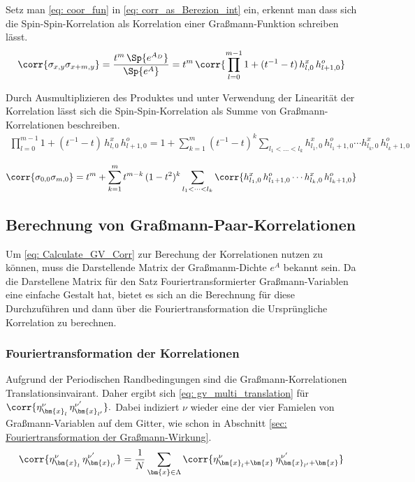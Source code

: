 \noindent Setz man \eqref{eq: coor_fun} in \eqref{eq: corr_as_Berezion_int} ein, erkennt man dass sich die Spin-Spin-Korrelation als Korrelation einer Graßmann-Funktion schreiben lässt.  
\begin{equation} \nonumber
\corr{\sigma_{x,y} \sigma_{x+m,y}} 
    =\frac{t^m \, \Sp{e^{A_D}}}{\Sp{e^A}} 
    =  t^m \, \corr{\prod_{l = 0}^{m-1} 1 + (t^{-1} - t)\, h_{l,0}^x\, h_{l+1,0}^o} 
\end{equation}

\noindent Durch Ausmultiplizieren des Produktes und unter Verwendung der Linearität der Korrelation lässt sich die Spin-Spin-Korrelation als Summe von Graßmann-Korrelationen beschreiben. 
\begin{align}
\prod_{l = 0}^{m-1} 1 + (t^{-1} - t)\, h_{l,0}^x\, h_{l+1,0}^o
= 1 + \sum_{k = 1}^{m} (t^{-1}-t)^k \sum_{l_1 < \dots < l_k} h_{l_1,0}^x\, h_{l_1+1,0}^o \cdots h_{l_k,0}^x\, h_{l_k+1,0}^o
\end{align}

\begin{grayframe}[frametitle = {Spin-Spin-Korrelation als Summe von Graßmann-Korrelationen}]
\begin{equation} \label{eq: Spin-Spin-Corr as Sum of GV corr}
    \corr{\sigma_{0,0} \sigma_{m,0}} = t^m  + \sum_{k = 1}^{m} t^{m-k} \, (1-t^2)^{k} \sum_{l_1 < \dots < l_k}  \corr{h_{l_1,0}^x\, h_{l_1+1,0}^o \cdots h_{l_k,0}^x\, h_{l_k+1,0}^o}
\end{equation}
\end{grayframe}

\subsection{Berechnung von Graßmann-Paar-Korrelationen}
Um \eqref{eq: Calculate_GV_Corr} zur Berechung der Korrelationen nutzen zu können, muss die Darstellende Matrix der Graßmanm-Dichte ${e^A}$ bekannt sein. Da die Darstellene Matrix für den Satz Fouriertransformierter Graßmann-Variablen eine einfache Gestalt hat, bietet es sich an die Berechnung für diese Durchzuführen und dann über die Fouriertransformation die Ursprüngliche Korrelation zu berechnen. 

\subsubsection{Fouriertransformation der Korrelationen}
Aufgrund der Periodischen Randbedingungen sind die Graßmann-Korrelationen Translationsinvairant. Daher ergibt sich \eqref{eq: gv_multi_translation} für $\corr{\eta_{\bm{x}_l}^{\nu}\, \eta_{\bm{x}_{l'}}^{\nu'} }.$ Dabei indiziert $\nu$ wieder eine der vier Famielen von Graßmann-Variablen auf dem Gitter, wie schon in Abschnitt \ref{sec: Fouriertransformation der Graßmann-Wirkung}. 
\begin{equation} \label{eq: gv_multi_translation}
\corr{\eta_{\bm{x}_l}^{\nu}\, \eta_{\bm{x}_{l'}}^{\nu'} } = \frac{1}{N} \sum_{\bm{x} \in \Lambda} \corr{\eta_{\bm{x}_l + \bm{x}}^{\nu} \,\eta_{\bm{x}_{l'} + \bm{x}}^{\nu'} }
\end{equation}

